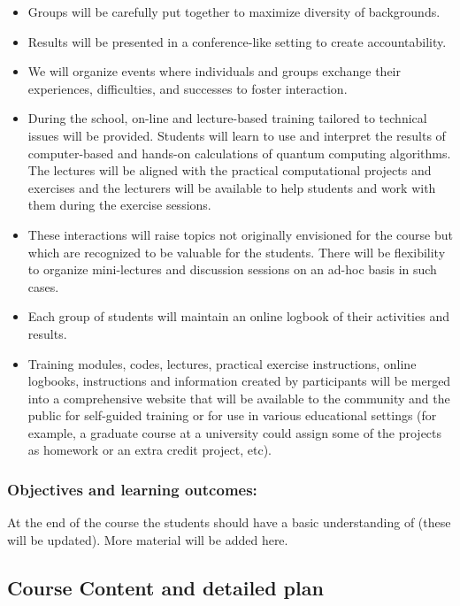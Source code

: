 \documentclass[twocolumn,superscriptaddress,amsmath,amssymb,
aps,floatfix]{revtex4-2}
\begin{document}
\begin{itemize}
\item
  Groups will be carefully put together to maximize diversity of
  backgrounds.
\item
  Results will be presented in a conference-like setting to create
  accountability.
\item
  We will organize events where individuals and groups exchange their
  experiences, difficulties, and successes to foster interaction.
\item
  During the school, on-line and lecture-based training tailored to
  technical issues will be provided. Students will learn to use and
  interpret the results of computer-based and hands-on calculations of
  quantum computing algorithms. The lectures will be aligned with the
  practical computational projects and exercises and the lecturers will
  be available to help students and work with them during the exercise
  sessions.
\item
  These interactions will raise topics not originally envisioned for the
  course but which are recognized to be valuable for the students. There
  will be flexibility to organize mini-lectures and discussion sessions
  on an ad-hoc basis in such cases.
\item
  Each group of students will maintain an online logbook of their
  activities and results.
\item
  Training modules, codes, lectures, practical exercise instructions,
  online logbooks, instructions and information created by participants
  will be merged into a comprehensive website that will be available to
  the community and the public for self-guided training or for use in
  various educational settings (for example, a graduate course at a
  university could assign some of the projects as homework or an extra
  credit project, etc).
\end{itemize}

    \subsubsection{Objectives and learning
outcomes:}\label{objectives-and-learning-outcomes}

At the end of the course the students should have a basic understanding
of (these will be updated). More material will be added here.

    \subsection{Course Content and detailed plan}
\end{document}
